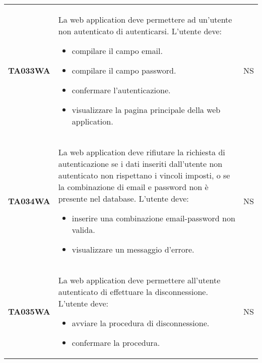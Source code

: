 \documentclass[../piano-di-qualifica.tex]{subfiles}
\begin{document}
\begin{longtable}[H]{>{\centering\bfseries}m{3cm} >{}m{10cm} >{\centering\arraybackslash}m{3cm}}
  TA033WA           & La web application deve permettere ad un'utente non autenticato di autenticarsi. \newline
  L'utente deve:
  \begin{itemize}
    \item compilare il campo email.
    \item compilare il campo password.
    \item confermare l'autenticazione.
    \item visualizzare la pagina principale della web application.
  \end{itemize}
                    & NS                                                                                                                                                                                                                                                               \\
  TA034WA           & La web application deve rifiutare la richiesta di autenticazione se i dati inseriti dall'utente non autenticato non rispettano i vincoli imposti, o se la combinazione di email e password non è presente nel database. \newline
  L'utente deve:
  \begin{itemize}
    \item inserire una combinazione email-password non valida.
    \item visualizzare un messaggio d'errore.
  \end{itemize}
                    & NS                                                                                                                                                                                                                                                               \\
  TA035WA           & La web application deve permettere all'utente autenticato di effettuare la disconnessione. \newline
  L'utente deve:
  \begin{itemize}
    \item avviare la procedura di disconnessione.
    \item confermare la procedura.
  \end{itemize}
                    & NS                                                                                                                                                                                                                                                               \\

\end{longtable}
\end{document}
